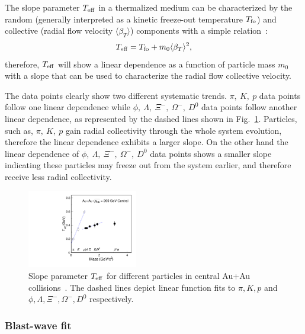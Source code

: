 \documentclass[%
 reprint,	
 amsmath,amssymb,
 aps,
 prc,
]{revtex4-1}
\begin{document}
The slope parameter $T_{\rm eff}$ in a thermalized medium can be characterized by the random (generally interpreted as a kinetic freeze-out temperature $T_{\rm fo}$) and collective (radial flow velocity $\langle\beta_{T}\rangle$) components with a simple relation~\cite{StarWhitePaper,Csorgo:1995bi,Kolb:2003dz}:
\begin{equation}
  \begin{aligned}
T_{\rm eff} = T_{\rm fo} + m_0 \langle\beta_{T}\rangle^2,
  \end{aligned}
\label{equ:equation7}
\end{equation}
therefore, $T_{\rm eff}$ will show a linear dependence as a function of particle mass $m_0$ with a slope that can be used to characterize the radial flow collective velocity.

The data points clearly show two different systematic trends. $\pi,\ K,\ p$ data points follow one linear dependence while $\phi,\ \Lambda,\ \Xi^{-},\ \Omega^{-},\ D^0$ data points follow another linear dependence, as represented by the dashed lines shown in Fig.~\ref{fig:Teff_ALL}. Particles, such as, $\pi,\ K,\ p$ gain radial collectivity through the whole system evolution, therefore the linear dependence exhibits a larger slope. On the other hand the linear dependence of $\phi,\ \Lambda,\ \Xi^{-},\ \Omega^{-},\ D^0$ data points shows a smaller slope indicating these particles may freeze out from the system earlier, and therefore receive less radial collectivity.


\begin{figure}
\centering
\includegraphics[width=0.43\textwidth]{fig/Teff_ALL.pdf}
\caption{Slope parameter $T_{\rm eff}$ for different particles in central Au+Au collisions~\cite{Adams:2003xp,Abelev:2007rw,Adams:2006ke,Adamczyk:2013tvk}. The dashed lines depict linear function fits to $\pi,K,p$ and $\phi,\Lambda,\Xi^{-},\Omega^{-},D^0$ respectively.}
\label{fig:Teff_ALL} 
\end{figure}


\subsubsection{Blast-wave fit}
\label{result:collectivity:BW}
\end{document}
